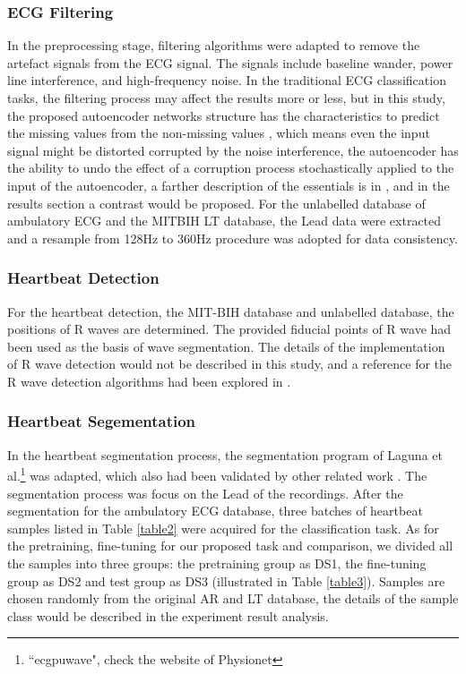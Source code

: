 \documentclass[journal]{IEEEtran}
\begin{document}
\subsubsection{ECG Filtering}
In the preprocessing stage, filtering algorithms were adapted to remove the artefact signals from the ECG signal. The signals include baseline wander, power line interference, and high-frequency noise. In the traditional ECG classification tasks, the filtering process may affect the results more or less, but in this study, the proposed autoencoder networks structure has the characteristics to predict the missing values from the non-missing values \cite{bengio2009}, which means even the input signal might be distorted corrupted by the noise interference, the autoencoder has the ability to undo the effect of a corruption process stochastically applied to the input of the autoencoder, a farther description of the essentials is in \cite{vincent}, and in the results section a contrast would be proposed. For the unlabelled database of ambulatory ECG and the MITBIH LT database, the Lead \uppercase\expandafter{} data were extracted and a resample from 128Hz to 360Hz procedure was adopted for data consistency.

\subsubsection{Heartbeat Detection}
For the heartbeat detection, the MIT-BIH database and unlabelled database, the positions of R waves are determined. The provided fiducial points of R wave had been used as the basis of wave segmentation. The details of the implementation of R wave detection would not be described in this study, and a reference for the R wave detection algorithms had been explored in \cite{afonso}.

\subsubsection{Heartbeat Segementation}
In the heartbeat segmentation process, the segmentation program of Laguna et al.\footnote{``ecgpuwave", check the website of Physionet} was adapted, which also had been validated by other related work \cite{chaza}. The segmentation process was focus on the  Lead \uppercase\expandafter{} of the recordings. After the segmentation for the ambulatory ECG database, three batches of heartbeat samples listed in Table \ref{table2} were acquired for the classification task. As for the pretraining, fine-tuning for our proposed task and comparison, we divided all the samples into three groups: the pretraining group as DS1, the fine-tuning group as DS2 and test group as DS3 (illustrated in Table \ref{table3}). Samples are chosen randomly from the original AR and LT database, the details of the sample class would be described in the experiment result analysis.
\end{document}
